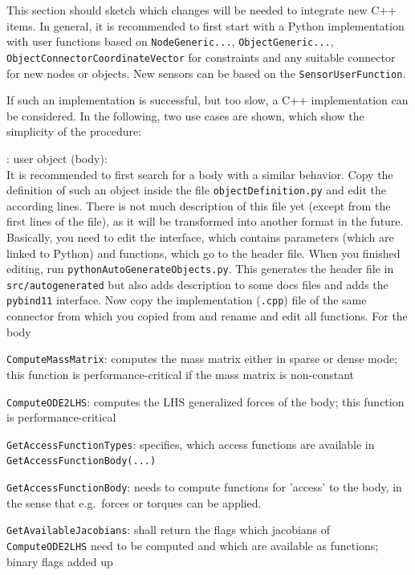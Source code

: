 %
This section should sketch which changes will be needed to integrate new C++ items.
In general, it is recommended to first start with a Python implementation with user functions based on
\texttt{NodeGeneric...}, \texttt{ObjectGeneric...}, \texttt{ObjectConnectorCoordinateVector} for constraints and
any suitable connector for new nodes or objects. New sensors can be based on the \texttt{SensorUserFunction}.

If such an implementation is successful, but too slow, a C++ implementation can be considered.
In the following, two use cases are shown, which show the simplicity of the procedure:
\bi
  \item {}: user object (body):\\
  It is recommended to first search for a body with a similar behavior.
  Copy the definition of such an object inside the file \texttt{objectDefinition.py} and edit the according lines. 
  There is not much description of 
  this file yet (except from the first lines of the file), as it will be transformed into another format in the future.
  Basically, you need to edit the interface, which contains parameters (which are linked to Python) and functions, 
  which go to the header file.
  When you finished editing, run \texttt{pythonAutoGenerateObjects.py}. This generates the header file in \texttt{src/autogenerated}
  but also adds description to some docs files and adds the \texttt{pybind11} interface. 
  Now copy the implementation (\texttt{.cpp}) file of the same connector from which you copied from and rename and edit all functions.
  For the body
  \bi
    \item \texttt{ComputeMassMatrix}: computes the mass matrix either in sparse or dense mode; this function is performance-critical if the mass matrix is non-constant
    \item \texttt{ComputeODE2LHS}: computes the \ac{LHS} generalized forces of the body; this function is performance-critical
    \item \texttt{GetAccessFunctionTypes}: specifies, which access functions are available in \texttt{GetAccessFunctionBody(...)}
    \item \texttt{GetAccessFunctionBody}: needs to compute functions for 'access' to the body, in the sense that e.g.\ forces or torques can be applied. 
    \item \texttt{GetAvailableJacobians}: shall return the flags which jacobians of \texttt{ComputeODE2LHS} need to be computed and which are available as functions; binary flags added up
